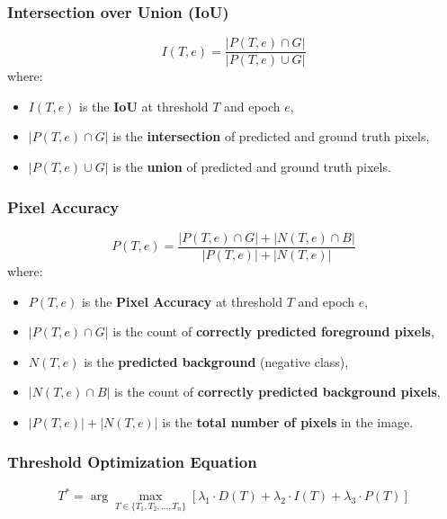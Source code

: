 \documentclass{article}
\begin{document}
\subsubsection{Intersection over Union (IoU)}
\begin{equation}
I(T, e) = \frac{|P(T, e) \cap G|}{|P(T, e) \cup G|}
\end{equation}
where:
\begin{itemize}
    \item \( I(T, e) \) is the \textbf{IoU} at threshold \( T \) and epoch \( e \),
    \item \( |P(T, e) \cap G| \) is the \textbf{intersection} of predicted and ground truth pixels,
    \item \( |P(T, e) \cup G| \) is the \textbf{union} of predicted and ground truth pixels.
\end{itemize}

\subsubsection{Pixel Accuracy}
\begin{equation}
P(T, e) = \frac{|P(T, e) \cap G| + |N(T, e) \cap B|}{|P(T, e)| + |N(T, e)|}
\end{equation}
where:
\begin{itemize}
    \item \( P(T, e) \) is the \textbf{Pixel Accuracy} at threshold \( T \) and epoch \( e \),
    \item \( |P(T, e) \cap G| \) is the count of \textbf{correctly predicted foreground pixels},
    \item \( N(T, e) \) is the \textbf{predicted background} (negative class),
    \item \( |N(T, e) \cap B| \) is the count of \textbf{correctly predicted background pixels},
    \item \( |P(T, e)| + |N(T, e)| \) is the \textbf{total number of pixels} in the image.
\end{itemize}


\subsubsection{Threshold Optimization Equation}
\begin{equation}
T^* = \arg\max_{T \in \{T_1, T_2, ..., T_n\}} \left[ \lambda_1 \cdot D(T) + \lambda_2 \cdot I(T) + \lambda_3 \cdot P(T) \right]
\label{eqn1}
\end{equation}
\end{document}
